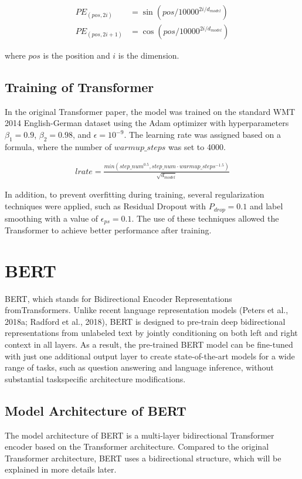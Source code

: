 \documentclass[conference]{IEEEtran}
\begin{document}
\begin{align*}
    PE_{(pos,2i)} &= \sin(pos/10000^{2i/d_{model}})\\
    PE_{(pos,2i+1)} &= \cos(pos/10000^{2i/d_{model}})
\end{align*}

\par where $pos$ is the position and $i$ is the dimension.


\subsection{Training of Transformer}
\par In the original Transformer paper, the model was trained on the standard WMT 2014 English-German 
dataset using the Adam optimizer with hyperparameters $\beta_1 = 0.9$, $\beta_2 = 0.98$, and 
$ \epsilon = 10^{-9}$. The learning rate was assigned based on a formula, where the number 
of $warmup\_steps$ was set to 4000.

\begin{align*}
    lrate = \frac{min({step\_num}^{0.5}, step\_num \cdot warmup\_steps^{-1.5})}{\sqrt{d_{model}}}
\end{align*}

\par In addition, to prevent overfitting during training, several regularization 
techniques were applied, such as Residual Dropout with $P_{drop} = 0.1$ and label 
smoothing with a value of $\epsilon_{ps} = 0.1$. The use of these techniques allowed 
the Transformer to achieve better performance after training.

\section{BERT}

\par BERT\cite{b2}, which stands for Bidirectional Encoder Representations fromTransformers. 
Unlike recent language representation models (Peters et al., 2018a; Radford et al., 2018), 
BERT is designed to pre-train deep bidirectional representations from
unlabeled text by jointly conditioning on both left and right context in all layers. As a 
result, the pre-trained BERT model can be fine-tuned with just one additional output layer
to create state-of-the-art models for a wide range of tasks, such as question answering and
language inference, without substantial taskspecific architecture modifications.

\subsection{Model Architecture of BERT}
\par The model architecture of BERT is a multi-layer bidirectional Transformer encoder 
based on the Transformer architecture. Compared to the original Transformer architecture, 
BERT uses a bidirectional structure, which will be explained in more details later.
\end{document}
